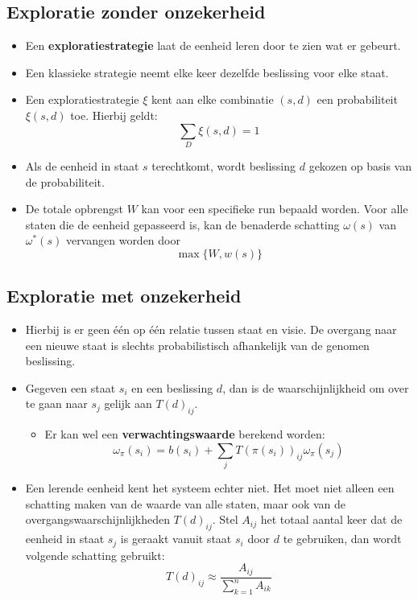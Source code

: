 \subsection{Exploratie zonder onzekerheid}
\begin{itemize}
	\item Een \textbf{exploratiestrategie} laat de eenheid leren door te zien wat er gebeurt.
	\item Een klassieke strategie neemt elke keer dezelfde beslissing voor elke staat.
	\item Een exploratiestrategie $\xi$ kent aan elke combinatie $(s, d)$ een probabiliteit $\xi(s, d)$ toe. Hierbij geldt:
	$$\sum_D \xi(s, d) = 1$$
	\item Als de eenheid in staat $s$ terechtkomt, wordt beslissing $d$ gekozen op basis van de probabiliteit.
	\item De totale opbrengst $W$ kan voor een specifieke run bepaald worden. Voor alle staten die de eenheid gepasseerd is, kan de benaderde schatting $\omega(s)$ van $\omega^*(s)$ vervangen worden door
	$$\max\{W, w(s)\}$$
\end{itemize}

\subsection{Exploratie met onzekerheid}
\begin{itemize}
	\item Hierbij is er geen één op één relatie tussen staat en visie. De overgang naar een nieuwe staat is slechts probabilistisch afhankelijk van de genomen beslissing.
	\item Gegeven een staat $s_i$ en een beslissing $d$, dan is de waarschijnlijkheid om over te gaan naar $s_j$ gelijk aan $T(d)_{ij}$. 
	\begin{itemize}
		\alert Dit heeft als gevolg dat de winst van een strategie $\pi$ niet exact kan voorspeld worden als we uit een staat $s$ vertrekken.
		\item Er kan wel een \textbf{verwachtingswaarde} berekend worden:
		{\color{OliveGreen}
		$$\omega_\pi(s_i) = b(s_i) + \sum_j T(\pi(s_i))_{ij}\omega_\pi(s_j)$$
		}
	\end{itemize}
	\item Een lerende eenheid kent het systeem echter niet. Het moet niet alleen een schatting maken van de waarde van alle staten, maar ook van de overgangswaarschijnlijkheden $T(d)_{ij}$. Stel $A_{ij}$ het totaal aantal keer dat de eenheid in staat $s_j$ is geraakt vanuit staat $s_i$ door $d$ te gebruiken, dan wordt volgende schatting gebruikt:
	$$T(d)_{ij} \approx \frac{A_{ij}}{\sum_{k=1}^{n}A_{ik}}$$
\end{itemize}

